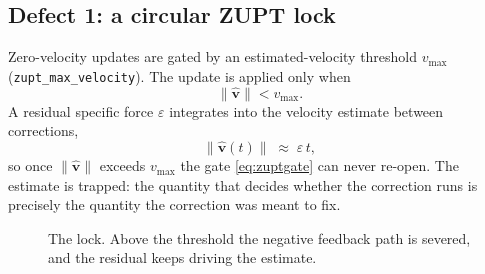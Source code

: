 \subsection{Defect 1: a circular ZUPT lock}
\label{sec:zuptlock}

Zero-velocity updates are gated by an estimated-velocity threshold
$v_{\max}$ (\texttt{zupt\_max\_velocity}). The update is applied only when
\begin{equation}
\|\hat{\mathbf{v}}\| < v_{\max}.
\label{eq:zuptgate}
\end{equation}
A residual specific force $\varepsilon$ integrates into the velocity estimate
between corrections,
\begin{equation}
\|\hat{\mathbf{v}}(t)\| \;\approx\; \varepsilon\,t ,
\label{eq:vgrowth}
\end{equation}
so once $\|\hat{\mathbf{v}}\|$ exceeds $v_{\max}$ the gate \eqref{eq:zuptgate}
can never re-open. The estimate is trapped: the quantity that decides whether
the correction runs is precisely the quantity the correction was meant to fix.

\begin{figure}[htbp]
\centering
{}
\caption[The ZUPT circular lock]{The lock. Above the threshold the negative
feedback path is severed, and the residual keeps driving the estimate.}
\label{fig:zuptlock}
\end{figure}

